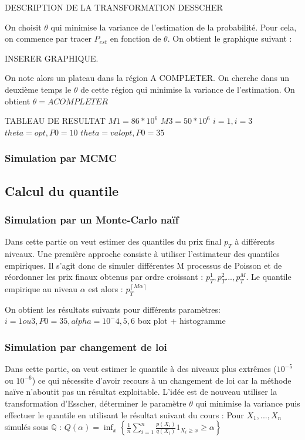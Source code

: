 \documentclass[a4paper,11pt]{article}
\begin{document}
DESCRIPTION DE LA TRANSFORMATION DESSCHER

On choisit $\theta$ qui minimise la variance de l'estimation de la probabilité. Pour cela, on commence par tracer $P_{est}$ en fonction de $\theta$. On obtient le graphique suivant :

INSERER GRAPHIQUE.

On note alors un plateau dans la région A COMPLETER. On cherche dans un deuxième temps le $\theta$ de cette région qui minimise la variance de l'estimation. 
On obtient $\theta= A COMPLETER$

TABLEAU DE RESULTAT
$M1=86 * 10^6$
$M3=50 * 10^6$
$i=1, i=3$
$theta=opt, P0=10$
$theta=val opt, P0=35$

\subsubsection{Simulation par MCMC}

\subsection{Calcul du quantile}

\subsubsection{Simulation par un Monte-Carlo naïf}
Dans cette partie on veut estimer des quantiles du prix final $p_{T}$ à différents niveaux. Une première approche consiste à utiliser l'estimateur des quantiles empiriques. Il s'agit donc de simuler différentes M processus de Poisson et de réordonner les prix finaux obtenus par ordre croissant : $p_{T}^{1}, p_{T}^{2}..., p_{T}^{M}$. Le quantile empirique au niveau $\alpha$ est alors : $p_{T}^{\left \lceil M\alpha  \right \rceil}$

On obtient les résultats suivants pour différents paramètres:
$i=1 ou 3, P0=35, alpha=10^-4, 5, 6$
box plot + histogramme

\subsubsection{Simulation par changement de loi}
Dans cette partie, on veut estimer le quantile à des niveaux plus extrêmes ($10^{-5}$ ou $10^{-6}$) ce qui nécessite d'avoir recours à un changement de loi car la méthode naïve n'aboutit pas un résultat exploitable. L'idée est de nouveau utiliser la transformation d'Esscher, déterminer le paramètre $\theta$ qui minimise la variance puis effectuer le quantile en utilisant le résultat suivant du cours :
Pour $X_{1},...,X_{n}$ simulés sous $\mathbb{Q}$ : 
$Q(\alpha)=\inf_{x} \left \{ \frac{1}{n}\sum_{i=1}^{n} \frac{p(X_{i})}{q(X_{i})}1_{X_{i}\geq x}\geq \alpha \right \}$
\end{document}
